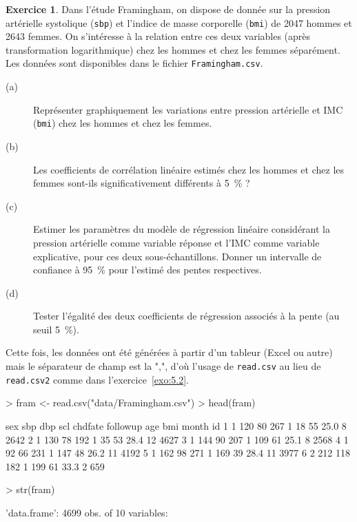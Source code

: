 \documentclass[11pt]{report}
\theoremstyle{definition}
\newtheorem{exo}{Exercice}[chapter]
\begin{document}
\begin{exo}\label{exo:5.3}
Dans l'étude Framingham, on dispose de donnée sur la pression artérielle
systolique (\texttt{sbp}) et l'indice de masse corporelle (\texttt{bmi}) de
2047 hommes et 2643 femmes.\autocite[p.~63]{dupont09} On s'intéresse à la
relation entre ces deux variables (après transformation logarithmique) chez
les hommes et chez les femmes séparément.
Les données sont disponibles dans le fichier \texttt{Framingham.csv}.
\begin{description}
\item[(a)] Représenter graphiquement les variations entre pression
  artérielle et IMC (\texttt{bmi}) chez les hommes et chez les femmes.
\item[(b)] Les coefficients de corrélation linéaire estimés chez les hommes
  et chez les femmes sont-ils significativement différents à 5~\% ?
\item[(c)] Estimer les paramètres du modèle de régression linéaire
  considérant la pression artérielle comme variable réponse et l'IMC comme
  variable explicative, pour ces deux sous-échantillons. Donner un
  intervalle de confiance à 95~\% pour l'estimé des pentes respectives.
\item[(d)] Tester l'égalité des deux coefficients de régression associés à
  la pente (au seuil 5~\%).
\end{description}
\begin{sol}
Cette fois, les données ont été générées à partir d'un tableur (Excel ou
autre) mais le séparateur de champ est la ",", d'où l'usage de
\texttt{read.csv} au lieu de \texttt{read.csv2} comme dans
l'exercice~\ref{exo:5.2}. 
\begin{Schunk}
\begin{Sinput}
> fram <- read.csv("data/Framingham.csv")
> head(fram)
\end{Sinput}
\begin{Soutput}
  sex sbp dbp scl chdfate followup age  bmi month   id
1   1 120  80 267       1       18  55 25.0     8 2642
2   1 130  78 192       1       35  53 28.4    12 4627
3   1 144  90 207       1      109  61 25.1     8 2568
4   1  92  66 231       1      147  48 26.2    11 4192
5   1 162  98 271       1      169  39 28.4    11 3977
6   2 212 118 182       1      199  61 33.3     2  659
\end{Soutput}
\begin{Sinput}
> str(fram)
\end{Sinput}
\begin{Soutput}
'data.frame':	4699 obs. of  10 variables:

\end{Soutput}
\end{Schunk}
\end{sol}
\end{exo}
\end{document}
